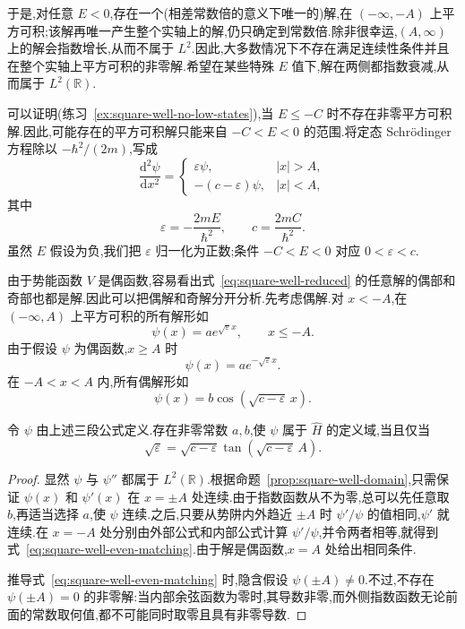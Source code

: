 于是,对任意 \(E<0\),存在一个(相差常数倍的意义下唯一的)解,在 \((-\infty,-A)\) 上平方可积;该解再唯一产生整个实轴上的解,仍只确定到常数倍.除非很幸运,\((A,\infty)\) 上的解会指数增长,从而不属于 \(L^{2}\).因此,大多数情况下不存在满足连续性条件并且在整个实轴上平方可积的非零解.希望在某些特殊 \(E\) 值下,解在两侧都指数衰减,从而属于 \(L^{2}(\mathbb{R})\).

可以证明(练习~\ref{ex:square-well-no-low-states}),当 \(E\le-C\) 时不存在非零平方可积解.因此,可能存在的平方可积解只能来自 \(-C<E<0\) 的范围.将定态 Schrödinger 方程除以 \(-\hbar^{2}/(2m)\),写成
\begin{equation}
\frac{\mathrm{d}^{2}\psi}{\mathrm{d}x^{2}}
=
\begin{cases}
\varepsilon\psi,&|x|>A,\\
-(c-\varepsilon)\psi,&|x|<A,
\end{cases}
\label{eq:square-well-reduced}
\end{equation}
其中
\begin{equation}
\varepsilon=-\frac{2mE}{\hbar^{2}},
\qquad
c=\frac{2mC}{\hbar^{2}}.
\label{eq:square-well-parameters}
\end{equation}
虽然 \(E\) 假设为负,我们把 \(\varepsilon\) 归一化为正数;条件 \(-C<E<0\) 对应 \(0<\varepsilon<c\).

由于势能函数 \(V\) 是偶函数,容易看出式~\eqref{eq:square-well-reduced} 的任意解的偶部和奇部也都是解.因此可以把偶解和奇解分开分析.先考虑偶解.对 \(x<-A\),在 \((-\infty,A)\) 上平方可积的所有解形如
\[
\psi(x)=ae^{\sqrt{\varepsilon}x},\qquad x\le-A.
\]
由于假设 \(\psi\) 为偶函数,\(x\ge A\) 时
\[
\psi(x)=ae^{-\sqrt{\varepsilon}x}.
\]
在 \(-A<x<A\) 内,所有偶解形如
\[
\psi(x)=b\cos\left(\sqrt{c-\varepsilon}\,x\right).
\]

\begin{proposition}[偶解的匹配条件]\label{prop:square-well-even-matching}
令 \(\psi\) 由上述三段公式定义.存在非零常数 \(a,b\),使 \(\psi\) 属于 \(\widehat H\) 的定义域,当且仅当
\begin{equation}
\sqrt{\varepsilon}
=\sqrt{c-\varepsilon}\tan\left(\sqrt{c-\varepsilon}\,A\right).
\label{eq:square-well-even-matching}
\end{equation}
\end{proposition}

\begin{proof}
显然 \(\psi\) 与 \(\psi''\) 都属于 \(L^{2}(\mathbb{R})\).根据命题~\ref{prop:square-well-domain},只需保证 \(\psi(x)\) 和 \(\psi'(x)\) 在 \(x=\pm A\) 处连续.由于指数函数从不为零,总可以先任意取 \(b\),再适当选择 \(a\),使 \(\psi\) 连续.之后,只要从势阱内外趋近 \(\pm A\) 时 \(\psi'/\psi\) 的值相同,\(\psi'\) 就连续.在 \(x=-A\) 处分别由外部公式和内部公式计算 \(\psi'/\psi\),并令两者相等,就得到式~\eqref{eq:square-well-even-matching}.由于解是偶函数,\(x=A\) 处给出相同条件.

推导式~\eqref{eq:square-well-even-matching} 时,隐含假设 \(\psi(\pm A)\ne0\).不过,不存在 \(\psi(\pm A)=0\) 的非零解:当内部余弦函数为零时,其导数非零,而外侧指数函数无论前面的常数取何值,都不可能同时取零且具有非零导数.
\end{proof}


